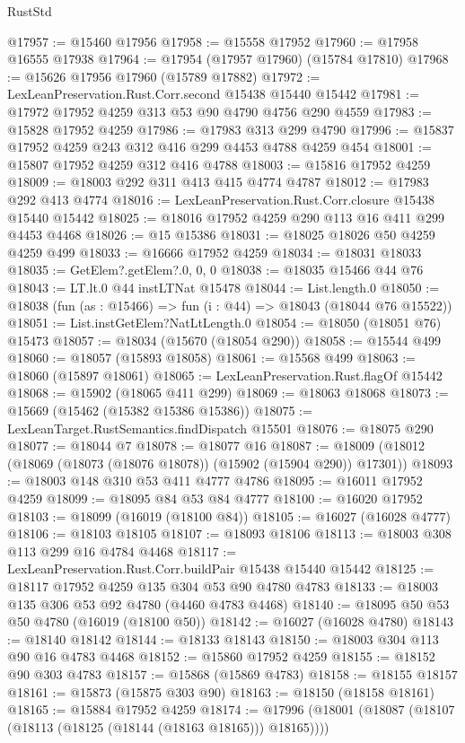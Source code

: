 \begin{lexlean}{RustStd}
\begin{coremodule}
@17957 := @15460 @17956
@17958 := @15558 @17952
@17960 := @17958 @16555 @17938
@17964 := @17954 (@17957 @17960) (@15784 @17810)
@17968 := @15626 @17956 @17960 (@15789 @17882)
@17972 := LexLeanPreservation.Rust.Corr.second @15438 @15440 @15442
@17981 := @17972 @17952 @4259 @313 @53 @90 @4790 @4756 @290 @4559
@17983 := @15828 @17952 @4259
@17986 := @17983 @313 @299 @4790
@17996 := @15837 @17952 @4259 @243 @312 @416 @299 @4453 @4788 @4259 @454
@18001 := @15807 @17952 @4259 @312 @416 @4788
@18003 := @15816 @17952 @4259
@18009 := @18003 @292 @311 @413 @415 @4774 @4787
@18012 := @17983 @292 @413 @4774
@18016 := LexLeanPreservation.Rust.Corr.closure @15438 @15440 @15442
@18025 := @18016 @17952 @4259 @290 @113 @16 @411 @299 @4453 @4468
@18026 := @15 @15386
@18031 := @18025 @18026 @50 @4259 @4259 @499
@18033 := @16666 @17952 @4259
@18034 := @18031 @18033
@18035 := GetElem?.getElem?.{0, 0, 0}
@18038 := @18035 @15466 @44 @76
@18043 := LT.lt.{0} @44 instLTNat @15478
@18044 := List.length.{0}
@18050 := @18038 (fun (as : @15466) => fun (i : @44) => @18043 (@18044 @76 @15522))
@18051 := List.instGetElem?NatLtLength.{0}
@18054 := @18050 (@18051 @76) @15473
@18057 := @18034 (@15670 (@18054 @290))
@18058 := @15544 @499
@18060 := @18057 (@15893 @18058)
@18061 := @15568 @499
@18063 := @18060 (@15897 @18061)
@18065 := LexLeanPreservation.Rust.flagOf @15442
@18068 := @15902 (@18065 @411 @299)
@18069 := @18063 @18068
@18073 := @15669 (@15462 (@15382 @15386 @15386))
@18075 := LexLeanTarget.RustSemantics.findDispatch @15501
@18076 := @18075 @290
@18077 := @18044 @7
@18078 := @18077 @16
@18087 := @18009 (@18012 (@18069 (@18073 (@18076 @18078)) (@15902 (@15904 @290)) @17301))
@18093 := @18003 @148 @310 @53 @411 @4777 @4786
@18095 := @16011 @17952 @4259
@18099 := @18095 @84 @53 @84 @4777
@18100 := @16020 @17952
@18103 := @18099 (@16019 (@18100 @84))
@18105 := @16027 (@16028 @4777)
@18106 := @18103 @18105
@18107 := @18093 @18106
@18113 := @18003 @308 @113 @299 @16 @4784 @4468
@18117 := LexLeanPreservation.Rust.Corr.buildPair @15438 @15440 @15442
@18125 := @18117 @17952 @4259 @135 @304 @53 @90 @4780 @4783
@18133 := @18003 @135 @306 @53 @92 @4780 (@4460 @4783 @4468)
@18140 := @18095 @50 @53 @50 @4780 (@16019 (@18100 @50))
@18142 := @16027 (@16028 @4780)
@18143 := @18140 @18142
@18144 := @18133 @18143
@18150 := @18003 @304 @113 @90 @16 @4783 @4468
@18152 := @15860 @17952 @4259
@18155 := @18152 @90 @303 @4783
@18157 := @15868 (@15869 @4783)
@18158 := @18155 @18157
@18161 := @15873 (@15875 @303 @90)
@18163 := @18150 (@18158 @18161)
@18165 := @15884 @17952 @4259
@18174 := @17996 (@18001 (@18087 (@18107 (@18113 (@18125 (@18144 (@18163 @18165))) @18165))))

\end{coremodule}
\end{lexlean}
